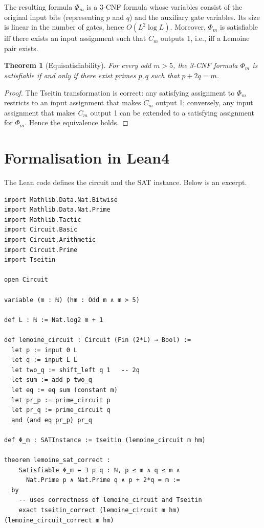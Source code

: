 \documentclass[11pt,a4paper]{article}
\newtheorem{theorem}{Theorem}[section]
\begin{document}
The resulting formula \(\Phi_m\) is a 3‑CNF formula whose variables consist of the original input bits (representing \(p\) and \(q\)) and the auxiliary gate variables. Its size is linear in the number of gates, hence \(O(L^2 \log L)\). Moreover, \(\Phi_m\) is satisfiable iff there exists an input assignment such that \(C_m\) outputs 1, i.e., iff a Lemoine pair exists.

\begin{theorem}[Equisatisfiability]\label{thm:equiv}
For every odd \(m > 5\), the 3‑CNF formula \(\Phi_m\) is satisfiable if and only if there exist primes \(p,q\) such that \(p+2q = m\).
\end{theorem}
\begin{proof}
The Tseitin transformation is correct: any satisfying assignment to \(\Phi_m\) restricts to an input assignment that makes \(C_m\) output 1; conversely, any input assignment that makes \(C_m\) output 1 can be extended to a satisfying assignment for \(\Phi_m\). Hence the equivalence holds.
\end{proof}

\section{Formalisation in Lean4}

The Lean code defines the circuit and the SAT instance. Below is an excerpt.

\begin{lstlisting}[style=lean, caption={SeriesXI/LemoineCircuit.lean (excerpt)}]
import Mathlib.Data.Nat.Bitwise
import Mathlib.Data.Nat.Prime
import Mathlib.Tactic
import Circuit.Basic
import Circuit.Arithmetic
import Circuit.Prime
import Tseitin

open Circuit

variable (m : ℕ) (hm : Odd m ∧ m > 5)

def L : ℕ := Nat.log2 m + 1

def lemoine_circuit : Circuit (Fin (2*L) → Bool) :=
  let p := input 0 L
  let q := input L L
  let two_q := shift_left q 1   -- 2q
  let sum := add p two_q
  let eq := eq sum (constant m)
  let pr_p := prime_circuit p
  let pr_q := prime_circuit q
  and (and eq pr_p) pr_q

def Φ_m : SATInstance := tseitin (lemoine_circuit m hm)

theorem lemoine_sat_correct :
    Satisfiable Φ_m ↔ ∃ p q : ℕ, p ≤ m ∧ q ≤ m ∧
      Nat.Prime p ∧ Nat.Prime q ∧ p + 2*q = m :=
  by
    -- uses correctness of lemoine_circuit and Tseitin
    exact tseitin_correct (lemoine_circuit m hm) (lemoine_circuit_correct m hm)
\end{lstlisting}
\end{document}
